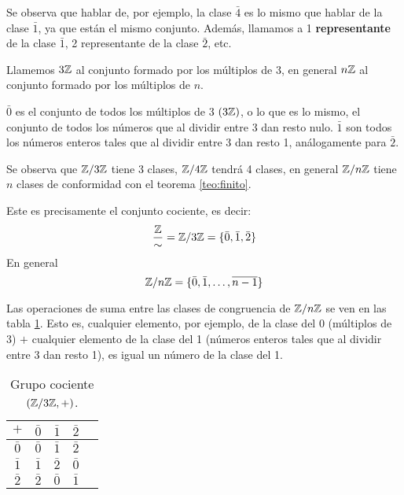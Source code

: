 Se observa que hablar de, por ejemplo, la clase $\bar{4}$ es lo mismo que hablar de la clase $\bar{1}$, ya que están el mismo conjunto. Además, llamamos a 1 \textbf{representante} de la clase $\bar{1}$, 2 representante de la clase $\bar{2}$, etc.

Llamemos $3\mathbb{Z}$ al conjunto formado por los múltiplos de 3, en general $n\mathbb{Z}$ al conjunto formado por los múltiplos de $n$.

$\bar{0}$ es el conjunto de todos los múltiplos de 3 $(3\mathbb{Z})$, o lo que es lo mismo, el conjunto de todos los números que al dividir entre 3 dan resto nulo. $\bar{1}$ son todos los números enteros tales que al dividir entre 3 dan resto 1, análogamente para $\bar{2}$.

Se observa que $\mathbb{Z}/3\mathbb{Z}$ tiene 3 clases, $\mathbb{Z}/4\mathbb{Z}$ tendrá 4 clases, en general $\mathbb{Z}/n\mathbb{Z}$ tiene $n$ clases de conformidad con el teorema \ref{teo:finito}.


Este es precisamente el conjunto cociente, es decir:
\[ \frac{\mathbb{Z}}{\sim} = \mathbb{Z} / 3\mathbb{Z} = \{ \bar{0}, \bar{1}, \bar{2} \}\]
En general
\[ \mathbb{Z} / n \mathbb{Z} = \{ \bar{0}, \bar{1}, \dots, \overline{n-1} \} \]

Las operaciones de suma entre las clases de congruencia de $\mathbb{Z}/n\mathbb{Z}$ se ven en las tabla \ref{tab:sclase}. Esto es, cualquier elemento, por ejemplo, de la clase del 0 (múltiplos de 3) $+$ cualquier elemento de la clase del 1 (números enteros tales que al dividir entre 3 dan resto 1), es igual un número de la clase del 1.

\begin{table}[H]
	\centering
	\begin{tabular}{c|cccc}
		$+$ & $\bar{0}$ & $\bar{1}$ & $\bar{2}$\\
		\hline
		$\bar{0}$ & $\bar{0}$ & $\bar{1}$ & $\bar{2}$\\
		$\bar{1}$ & $\bar{1}$ & $\bar{2}$ & $\bar{0}$\\
		$\bar{2}$ & $\bar{2}$ & $\bar{0}$ & $\bar{1}$
	\end{tabular}
	\caption{ Grupo cociente $\left( \mathbb{Z}/3\mathbb{Z}, + \right)$.}
	\label{tab:sclase}
\end{table}

